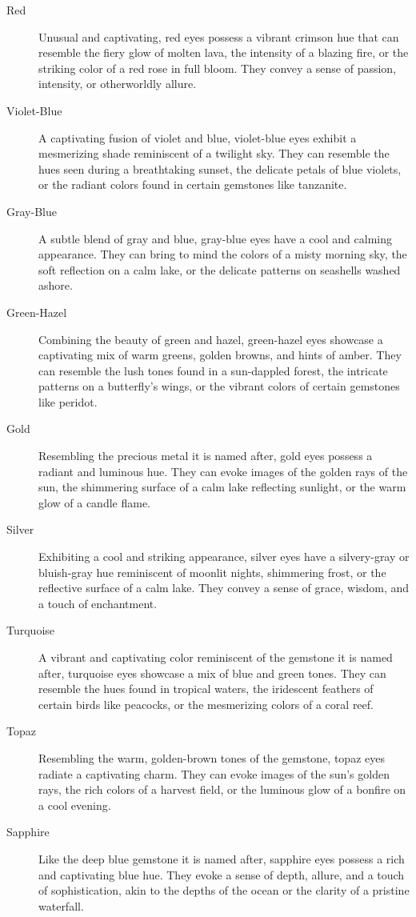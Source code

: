 \begin{description}
    \item[Red] Unusual and captivating, red eyes possess a vibrant crimson hue that can resemble the fiery glow of molten lava, the intensity of a blazing fire, or the striking color of a red rose in full bloom. They convey a sense of passion, intensity, or otherworldly allure.
    \item[Violet-Blue] A captivating fusion of violet and blue, violet-blue eyes exhibit a mesmerizing shade reminiscent of a twilight sky. They can resemble the hues seen during a breathtaking sunset, the delicate petals of blue violets, or the radiant colors found in certain gemstones like tanzanite.
    \item[Gray-Blue] A subtle blend of gray and blue, gray-blue eyes have a cool and calming appearance. They can bring to mind the colors of a misty morning sky, the soft reflection on a calm lake, or the delicate patterns on seashells washed ashore.
    \item[Green-Hazel] Combining the beauty of green and hazel, green-hazel eyes showcase a captivating mix of warm greens, golden browns, and hints of amber. They can resemble the lush tones found in a sun-dappled forest, the intricate patterns on a butterfly's wings, or the vibrant colors of certain gemstones like peridot.
    \item[Gold] Resembling the precious metal it is named after, gold eyes possess a radiant and luminous hue. They can evoke images of the golden rays of the sun, the shimmering surface of a calm lake reflecting sunlight, or the warm glow of a candle flame.
    \item[Silver] Exhibiting a cool and striking appearance, silver eyes have a silvery-gray or bluish-gray hue reminiscent of moonlit nights, shimmering frost, or the reflective surface of a calm lake. They convey a sense of grace, wisdom, and a touch of enchantment.
    \item[Turquoise] A vibrant and captivating color reminiscent of the gemstone it is named after, turquoise eyes showcase a mix of blue and green tones. They can resemble the hues found in tropical waters, the iridescent feathers of certain birds like peacocks, or the mesmerizing colors of a coral reef.
    \item[Topaz] Resembling the warm, golden-brown tones of the gemstone, topaz eyes radiate a captivating charm. They can evoke images of the sun's golden rays, the rich colors of a harvest field, or the luminous glow of a bonfire on a cool evening.
    \item[Sapphire] Like the deep blue gemstone it is named after, sapphire eyes possess a rich and captivating blue hue. They evoke a sense of depth, allure, and a touch of sophistication, akin to the depths of the ocean or the clarity of a pristine waterfall.

\end{description}
